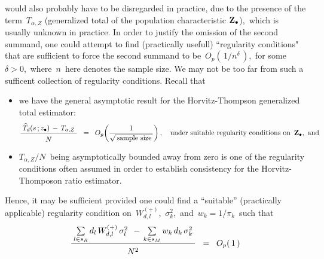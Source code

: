\begin{itemize}
\begin{itemize}
        would also probably have to be disregarded in practice,
        due to the presence of the term \,$T_{\alpha,Z}$
        (generalized total of the population characteristic $\mathbf{Z}_{\bullet}$),\,
        which is usually unknown in practice.
        \vskip 0.1cm
        In order to justify the omission of the second summand,
        one could attempt to find (practically usefull) ``regularity conditions"
        that are sufficient to force the second summand to be
        \,$O_{p}\!\left(\,1/n^{\delta}\,\right)$,\,
        for some \,$\delta > 0$,\,
        where \,$n$\, here denotes the sample size.
        We may not be too far from such a sufficent collection of regularity conditions.
        Recall that
        \begin{itemize}
        \item
            we have the general asymptotic result for the Horvitz-Thompson generalized total estimator:
            \begin{equation*}
            \dfrac{
                {\color{white}.}
                \widehat{T}_{d}(s\,;\zdot) \,-\, {\color{black}T_{\alpha,Z}}
                {\color{white}.}
                }{
                \overset{{\color{white}.}}{
                    N
                    }
                }
            \;\; = \;\;
                O_{p}\!\left(\dfrac{1}{\sqrt{\textnormal{\,sample size\,}}}\right),
            \quad
            \textnormal{under suitable regularity conditions on \,$\Zdot$,\, and}
            \end{equation*}
        \item
            $T_{\alpha,Z} \slash N$\, being asymptotically bounded away from zero
            is one of the regularity conditions often assumed in order to establish
            consistency for the Horvitz-Thomposon ratio estimator.
        \end{itemize}
        Hence, it may be sufficient provided one could find
        a ``suitable'' (practically applicable) regularity condition on
        \,$W^{(+)}_{d,l}$,\, $\sigma^{2}_{k}$,\, and \,$w_{k} = 1/\pi_{k}$\,
        such that
        \begin{equation*}
        \dfrac{
            {\color{white}.}
            \underset{l \in s_{R}}{\sum}\,
            d_{l}\,W^{(+)}_{d,l}\,\sigma_{l}^{2}
            \;\,-\,
            \underset{k \in s_{M}}{\sum}\,
            w_{k}\,d_{k}\,\sigma_{k}^{2}
            {\color{white}.}
            }{
            \overset{{\color{white}.}}{N^{2}}                
            }
        \;\; = \;\;
            O_{p}\!\left(\,1\,\right)

\end{equation*}
\end{itemize}
\end{itemize}
